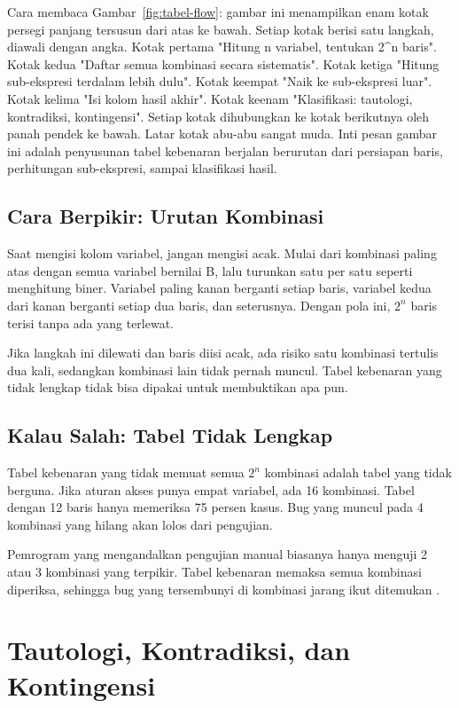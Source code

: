 \documentclass[11pt,a4paper]{article}
\begin{document}
Cara membaca Gambar~\ref{fig:tabel-flow}: gambar ini menampilkan enam kotak persegi panjang tersusun dari atas ke bawah. Setiap kotak berisi satu langkah, diawali dengan angka. Kotak pertama "Hitung n variabel, tentukan 2^n baris". Kotak kedua "Daftar semua kombinasi secara sistematis". Kotak ketiga "Hitung sub-ekspresi terdalam lebih dulu". Kotak keempat "Naik ke sub-ekspresi luar". Kotak kelima "Isi kolom hasil akhir". Kotak keenam "Klasifikasi: tautologi, kontradiksi, kontingensi". Setiap kotak dihubungkan ke kotak berikutnya oleh panah pendek ke bawah. Latar kotak abu-abu sangat muda. Inti pesan gambar ini adalah penyusunan tabel kebenaran berjalan berurutan dari persiapan baris, perhitungan sub-ekspresi, sampai klasifikasi hasil.

\subsection{Cara Berpikir: Urutan Kombinasi}

Saat mengisi kolom variabel, jangan mengisi acak. Mulai dari kombinasi paling atas dengan semua variabel bernilai B, lalu turunkan satu per satu seperti menghitung biner. Variabel paling kanan berganti setiap baris, variabel kedua dari kanan berganti setiap dua baris, dan seterusnya. Dengan pola ini, $2^n$ baris terisi tanpa ada yang terlewat.

Jika langkah ini dilewati dan baris diisi acak, ada risiko satu kombinasi tertulis dua kali, sedangkan kombinasi lain tidak pernah muncul. Tabel kebenaran yang tidak lengkap tidak bisa dipakai untuk membuktikan apa pun.

\subsection{Kalau Salah: Tabel Tidak Lengkap}

Tabel kebenaran yang tidak memuat semua $2^n$ kombinasi adalah tabel yang tidak berguna. Jika aturan akses punya empat variabel, ada 16 kombinasi. Tabel dengan 12 baris hanya memeriksa 75 persen kasus. Bug yang muncul pada 4 kombinasi yang hilang akan lolos dari pengujian.

Pemrogram yang mengandalkan pengujian manual biasanya hanya menguji 2 atau 3 kombinasi yang terpikir. Tabel kebenaran memaksa semua kombinasi diperiksa, sehingga bug yang tersembunyi di kombinasi jarang ikut ditemukan \cite{oregan}.

\section{Tautologi, Kontradiksi, dan Kontingensi}
\end{document}
